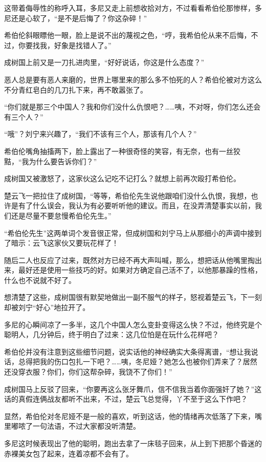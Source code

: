 这带着侮辱性的称呼入耳，多尼又走上前想收拾对方，不过看看希伯伦那惨样，多尼还是心软了，“是不是后悔了？你这杂碎！”

希伯伦斜眼瞟他一眼，脸上是说不出的蔑视之色，“哼，我希伯伦从来不后悔，不过，你要找我，好象是找错人了。”

成树国上前又是一刀扎进肉里，“好好说话，你这是什么态度？”

恶人总是要有恶人来磨的，世界上哪里来的那么多不怕死的人？希伯伦被对方这么不分青红皂白的几刀扎下来，再不敢嚣张了。

“你们就是那三个中国人？我和你们没什么仇恨吧？……咦，不对呀，你们怎么还会有三个人？”

“哦”？刘宁来兴趣了，“我们不该有三个人，那该有几个人？”

希伯伦嘴角抽搐两下，脸上露出了一种很奇怪的笑容，有无奈，也有一丝狡黠，“我为什么要告诉你们？”

成树国又被激怒了，这家伙这么记吃不记打么？就想上前再次殴打希伯伦。

楚云飞一把拉住了成树国，“等等，希伯伦先生说他跟咱们没什么仇恨，我想，也许是有了什么误会，我认为有必要听听他的建议。而且，在没弄清楚事实以前，我们还是尽量不要怠慢希伯伦先生。”

“希伯伦先生”这两单词个发音很正常，但成树国和刘宁马上从那细小的声调中接到了暗示：云飞这家伙又要玩花样了！

随后二人也反应了过来，既然对方已经不再大声叫喊，那么，想把话从他嘴里掏出来，最好还是使用一些技巧的好。如果对方确定自己活不了，以他那暴躁的性格，什么也不说就不好了。

想清楚了这些，成树国很有默契地做出一副不服气的样子，怒视着楚云飞，下一刻却被刘宁“好心”地拉开了。

多尼的心瞬间凉了一多半，这几个中国人怎么变卦变得这么快？不过，他终究是个聪明人，几分钟后，终于明白了过来：这几位怕是在玩什么花样吧？

希伯伦并没有注意到这些细节问题，说实话他的神经确实大条得离谱，“想让我说话，总得把我的伤口包扎一下吧？……咦，冬尼娅？她怎么也被你们弄来了？居然还没穿衣服？你们，你们这帮杂碎，我饶不了你们！”

成树国马上反驳了回来，“你要再这么张牙舞爪，信不信我当着你面强奸了她？”这话的真假连俩战友都听不出来，不过，楚云飞总觉得，丫不至于这么下作吧？

显然，希伯伦对冬尼娅不是一般的喜欢，听到这话，他的情绪再次低落了下来，嘴里嘟哝了一句法语，不过大家都没听清楚。

多尼这时候表现出了他的聪明，跑出去拿了一床毯子回来，从上到下把那个昏迷的赤裸美女包了起来，连着凉都不会有了。

